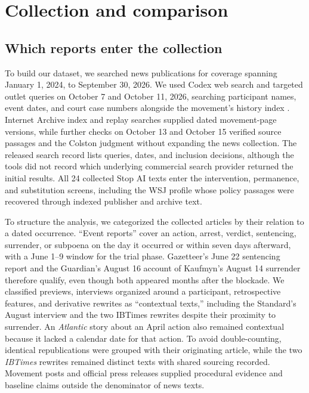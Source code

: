 \documentclass[11pt]{article}
\begin{document}
\section{Collection and comparison}
\subsection{Which reports enter the collection}
To build our dataset, we searched news publications for coverage spanning January 1, 2024, to September 30, 2026. We used Codex web search and targeted outlet queries on October 7 and October 11, 2026, searching participant names, event dates, and court case numbers alongside the movement's history index \citep{stophistory}. Internet Archive index and replay searches supplied dated movement-page versions, while further checks on October 13 and October 15 verified source passages and the Colston judgment without expanding the news collection. The released search record lists queries, dates, and inclusion decisions, although the tools did not record which underlying commercial search provider returned the initial results. All 24 collected Stop AI texts enter the intervention, permanence, and substitution screens, including the WSJ profile whose policy passages were recovered through indexed publisher and archive text.

To structure the analysis, we categorized the collected articles by their relation to a dated occurrence. ``Event reports'' cover an action, arrest, verdict, sentencing, surrender, or subpoena on the day it occurred or within seven days afterward, with a June 1--9 window for the trial phase. Gazetteer's June 22 sentencing report and the Guardian's August 16 account of Kaufmyn's August 14 surrender therefore qualify, even though both appeared months after the blockade. We classified previews, interviews organized around a participant, retrospective features, and derivative rewrites as ``contextual texts,'' including the Standard's August interview and the two IBTimes rewrites despite their proximity to surrender. An \textit{Atlantic} story about an April action also remained contextual because it lacked a calendar date for that action. To avoid double-counting, identical republications were grouped with their originating article, while the two \textit{IBTimes} rewrites remained distinct texts with shared sourcing recorded. Movement posts and official press releases supplied procedural evidence and baseline claims outside the denominator of news texts.
\end{document}
